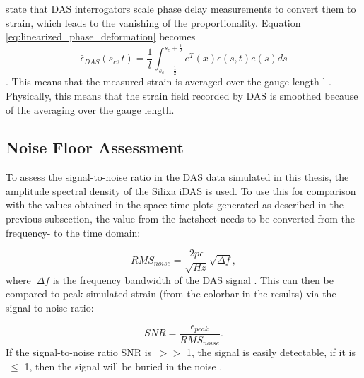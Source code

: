 \cite{noeFrontiersFullwaveformSeismology2025} state that DAS interrogators scale phase delay measurements to convert them to strain, which leads to the vanishing of the proportionality. Equation \ref{eq:linearized_phase_deformation} becomes \begin{equation}
  \bar{\epsilon}_{DAS}(s_c,t)= \frac{1}{l} \int_{s_c -\frac{1}{2}}^{s_c +\frac{1}{2}}e^T(x)\epsilon(s,t)e(s)ds
\end{equation} \parencite{noeFrontiersFullwaveformSeismology2025}. This means that the measured strain is averaged over the gauge length l \parencite{noeFrontiersFullwaveformSeismology2025}. Physically, this means that the strain field recorded by DAS is smoothed because of the averaging over the gauge length. \par

\subsection{Noise Floor Assessment}
To assess the signal-to-noise ratio in the DAS data simulated in this thesis, the amplitude spectral density of the Silixa iDAS is used. To use this for comparison with the values obtained in the space-time plots generated as described in the previous subsection, the value from the factsheet \parencite{idasdatasheet} needs to be converted from the frequency- to the time domain: 

\begin{equation}
  RMS_{noise} = \frac{2 p\epsilon}{\sqrt{Hz}} \sqrt{\Delta f},
  \label{eq:rms_noise}
\end{equation} where $\ \Delta f$ is the frequency bandwidth of the DAS signal \parencite{parkerDistributedAcousticSensing2014}. This can then be compared to peak simulated strain (from the colorbar in the results) via the signal-to-noise ratio:

\begin{equation}
  SNR = \frac{\epsilon_{peak}}{RMS_{noise}}. 
  \label{eq:snr}
\end{equation} If the signal-to-noise ratio SNR is $\ \gt \gt$ 1, the signal is easily detectable, if it is $\ \leq$ 1, then the signal will be buried in the noise \parencite{guRemovingInstrumentalNoise2024}. 


